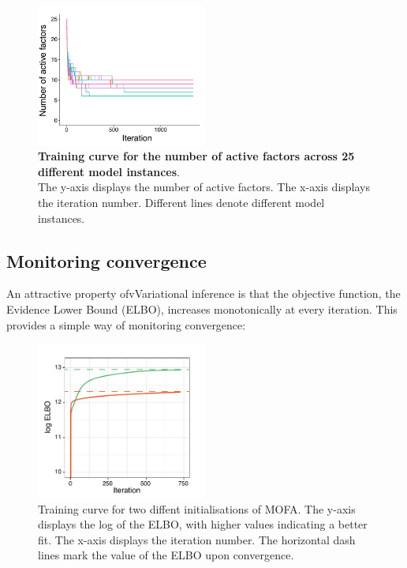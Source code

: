 \begin{figure}[H]
	\centering 	
	\includegraphics[width=0.5\textwidth]{MOFA_nfactors}
	\caption{\textbf{Training curve for the number of active factors across 25 different model instances}.\\
	The y-axis displays the number of active factors. The x-axis displays the iteration number. Different lines denote different model instances.}
	\label{fig:mofa_nfactors}
\end{figure}

\subsection{Monitoring convergence}
An attractive property ofvVariational inference is that the objective function, the Evidence Lower Bound (ELBO), increases monotonically at every iteration. This provides a simple way of monitoring convergence:

 \begin{figure}[H]
	\centering 	
	\includegraphics[width=0.5\textwidth]{elbo_convergence}
	\caption{Training curve for two diffent initialisations of MOFA. The y-axis displays the log of the ELBO, with higher values indicating a better fit. The x-axis displays the iteration number. The horizontal dash lines mark the value of the ELBO upon convergence. }
	\label{fig:elbo_convergence}
\end{figure}


